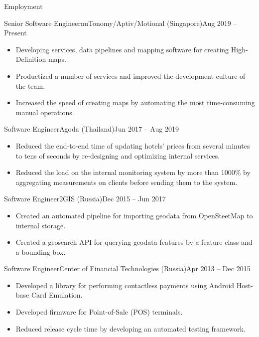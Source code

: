 \documentclass[]{cv}
\begin{document}
	\makeheader

	\begin{cvsection}{Employment}
    \begin{cvsubsection}{Senior Software Engineer}{nuTonomy/Aptiv/Motional (Singapore)}{Aug 2019 -- Present}
			\begin{itemize}
        \item Developing services, data pipelines and mapping software for creating High-Definition maps.
				\item Productized a number of services and improved the development culture of the team.
				\item Increased the speed of creating maps by automating the most time-consuming manual operations.
			\end{itemize}
		\end{cvsubsection}

    \begin{cvsubsection}{Software Engineer}{Agoda (Thailand)}{Jun 2017 -- Aug 2019}
			\begin{itemize}
				\item Reduced the end-to-end time of updating hotels' prices from several minutes to tens of seconds by re-designing and optimizing internal services.
				\item Reduced the load on the internal monitoring system by more than 1000\% by aggregating measurements on clients before sending them to the system.
			\end{itemize}
		\end{cvsubsection}

    \begin{cvsubsection}{Software Engineer}{2GIS (Russia)}{Dec 2015 -- Jun 2017}
			\begin{itemize}
				\item Created an automated pipeline for importing geodata from OpenSteetMap to internal storage.
				\item Created a geosearch API for querying geodata features by a feature class and a bounding box.
			\end{itemize}
		\end{cvsubsection}

    \begin{cvsubsection}{Software Engineer}{Center of Financial Technologies (Russia)}{Apr 2013 -- Dec 2015}
			\begin{itemize}
        \item Developed a library for performing contactless payments using Android Host-base Card Emulation.
        \item Developed firmware for Point-of-Sale (POS) terminals.
        \item Reduced release cycle time by developing an automated testing framework.
			\end{itemize}
		\end{cvsubsection}

	\end{cvsection}
\end{document}
